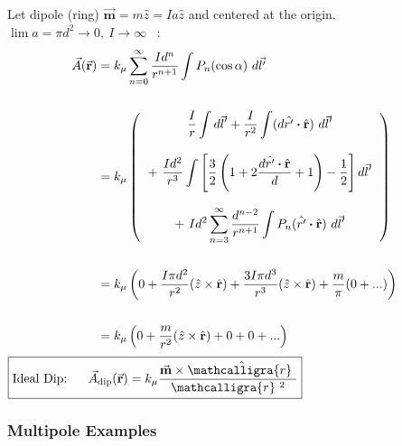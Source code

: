 \documentclass[12pt]{article}
\newcommand{\bfr}{\mathbf{r}}
\newcommand{\scripty}[1]{\ensuremath{\mathcalligra{#1}}}
\newcommand{\cursrr}{\scripty{r}\ }
\newcommand{\dotP}{\boldsymbol \cdot}		%
\begin{document}
\begin{minipage}[t]{0.48\textwidth}
	Let dipole (ring) \( \vec{ \mathbf{m} } = m \hat{z} = Ia \hat{z} \) and centered at the origin. \\[15pt]
	\(\lim a = \pi d^2 \rightarrow 0, \ I \rightarrow \infty \) \ :
	\begin{align*}
		\vec{A}( \vec{ \mathbf{r} } ) &= k_\mu \sum_{n=0}^\infty 
			\frac{Id^n}{r^{n+1}} \int P_n (\cos{\alpha}) \ d\vec{l'}\\ \\
		&= k_\mu \left( 
				\begin{tabular}{c}
					\( \displaystyle \frac{I}{r} \int d\vec{l}' 
						+ \frac{I}{r^2} \int ( d \hat{r'} \dotP \hat{\bfr} ) \ d\vec{l}' \) \\ \\
					\( \displaystyle + \ \frac{Id^2}{r^3} \int 
						\left[ \frac{3}{2} \left( 1 + 2 \frac{d \hat{r'} \dotP \hat{\bfr}}{d} + 1 \right) 
						- \frac{1}{2} \right] d\vec{l}' \) \\ \\ 
					\( \displaystyle + \ I d^2 \sum_{n=3}^\infty \frac{d^{n-2}}{r^{n+1}} \int P_n (\hat{r'} \dotP \hat{\bfr}) \ d\vec{l}' \)	
				\end{tabular} 
			\right) \\ \\
		&= k_\mu \left( 0
			+ \frac{I \pi d^2}{r^2} ( \hat{z} \times \hat{\bfr} )
			+ \frac{3 I \pi d^3}{r^3} ( \hat{z} \times \hat{\bfr} )
			+ \frac{m}{\pi} (0 + ...) \right)\\ \\
		&= k_\mu \left( 0
			+ \frac{m}{r^2} ( \hat{z} \times \hat{\bfr} )
			+ 0 + 0 + ... \right)
	\end{align*}
	\hfill \break
	\( \boxed{ \text{Ideal Dip:} \ \ \ \ \ \vec{A}_{ \text{dip} }( \vec{ \mathbf{r} } ) 
		= k_\mu \frac{ \vec{ \mathbf{m} } \times \hat{\cursrr} }{\cursrr^{2}} } \)
\end{minipage}

%
%
\newpage
\subsubsection{Multipole Examples}
\end{document}
